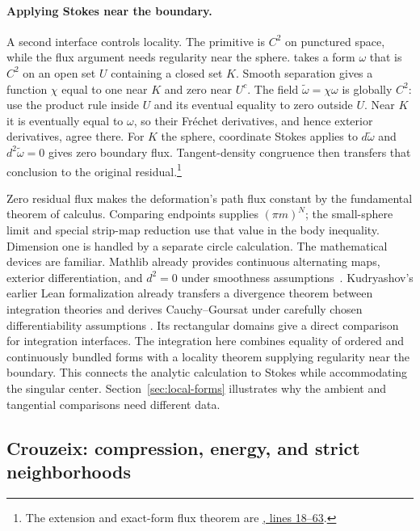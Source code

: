 \paragraph{Applying Stokes near the boundary.}
A second interface controls locality. The primitive is $C^2$ on punctured
space, while the flux argument needs regularity near the sphere.
 takes a form $\omega$ that is $C^2$
on an open set $U$ containing a closed set $K$. Smooth separation gives a
function $\chi$ equal to one near $K$ and zero near $U^c$.
The field $\widetilde\omega=\chi\omega$ is globally $C^2$: use the product
rule inside $U$ and its eventual equality to zero outside $U$.
Near $K$ it is eventually equal to $\omega$, so their Fr\'echet derivatives,
and hence exterior derivatives, agree there.
For $K$ the sphere, coordinate Stokes applies to $d\widetilde\omega$ and
$d^2\widetilde\omega=0$ gives zero boundary flux. Tangent-density congruence
then transfers that conclusion to the original residual.\footnote{The
extension and exact-form flux theorem are
\href{https://github.com/openai/math/blob/fd4aeeb2ee4fc729c18d98444fed42fd0529eeeb/lean/OAI/Analysis/Mahler/ClosedBoundaryStokes.lean\#L18-L63}{, lines 18--63}.}

Zero residual flux makes the deformation's path flux constant by the
fundamental theorem of calculus. Comparing endpoints supplies $(\pi m)^N$;
the small-sphere limit and special strip-map reduction use that value in the
body inequality. Dimension one is handled by a separate circle calculation.
The mathematical devices are familiar. Mathlib already provides continuous
alternating maps, exterior differentiation, and $d^2=0$ under smoothness
assumptions~\citep{MathlibForms}. Kudryashov's earlier Lean formalization already transfers a divergence
theorem between integration theories and derives Cauchy--Goursat under
carefully chosen differentiability assumptions \citep{Kudryashov2022}.
Its rectangular domains give a direct comparison for integration
interfaces. The integration here combines equality of ordered and continuously bundled forms with a locality theorem supplying regularity near the boundary. This connects the analytic calculation to Stokes while accommodating the singular center. Section~\ref{sec:local-forms} illustrates why the ambient and tangential comparisons need different data.

\subsection{Crouzeix: compression, energy, and strict neighborhoods}
\label{sec:crouzeix}

